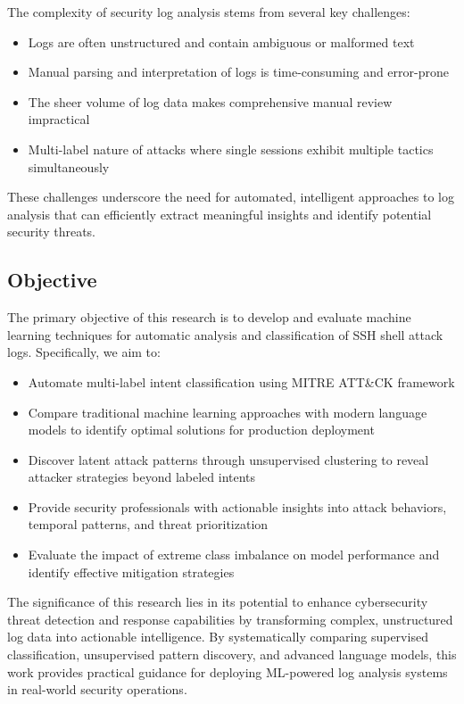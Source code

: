 \documentclass[acmlarge,screen,nonacm]{acmart}
\begin{document}
The complexity of security log analysis stems from several key challenges:
\begin{itemize}
    \item Logs are often unstructured and contain ambiguous or malformed text
    \item Manual parsing and interpretation of logs is time-consuming and error-prone
    \item The sheer volume of log data makes comprehensive manual review impractical
    \item Multi-label nature of attacks where single sessions exhibit multiple tactics simultaneously
\end{itemize}

These challenges underscore the need for automated, intelligent approaches to log analysis that can efficiently extract meaningful insights and identify potential security threats.

\subsection{Objective}

The primary objective of this research is to develop and evaluate machine learning techniques for automatic analysis and classification of SSH shell attack logs. Specifically, we aim to:

\begin{itemize}
    \item Automate multi-label intent classification using MITRE ATT\&CK framework
    \item Compare traditional machine learning approaches with modern language models to identify optimal solutions for production deployment
    \item Discover latent attack patterns through unsupervised clustering to reveal attacker strategies beyond labeled intents
    \item Provide security professionals with actionable insights into attack behaviors, temporal patterns, and threat prioritization
    \item Evaluate the impact of extreme class imbalance on model performance and identify effective mitigation strategies
\end{itemize}

The significance of this research lies in its potential to enhance cybersecurity threat detection and response capabilities by transforming complex, unstructured log data into actionable intelligence. By systematically comparing supervised classification, unsupervised pattern discovery, and advanced language models, this work provides practical guidance for deploying ML-powered log analysis systems in real-world security operations.
\end{document}
